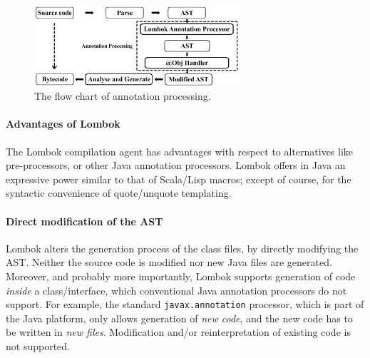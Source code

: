 
\begin{figure}[t]
\saveSpaceFig
\centering
\includegraphics[width=3in]{pdfs/lombok3.png}
\caption{The flow chart of \mixin annotation processing.
}
\label{fig:lombok}
\saveSpaceFig
\end{figure}


\paragraph{Advantages of Lombok}
The Lombok compilation agent has advantages with respect to alternatives like
pre-processors, or other Java annotation processors.
Lombok offers in Java an expressive power similar to that of Scala/Lisp macros;
except of course, for the syntactic convenience of quote/unquote templating.


\paragraph{Direct modification of the AST}
Lombok alters the generation process of the class files,
by directly modifying the AST. Neither the source code is modified nor
new Java files are generated. Moreover, and probably more importantly,
Lombok supports generation of code \emph{inside} a class/interface,
which conventional Java annotation processors do not support. For
example, the standard \texttt{javax.annotation} processor, which is part of the
Java platform, only allows generation of \emph{new code}, and the
new code has to be written in \emph{new files}. Modification and/or
reinterpretation of existing code is not supported.

